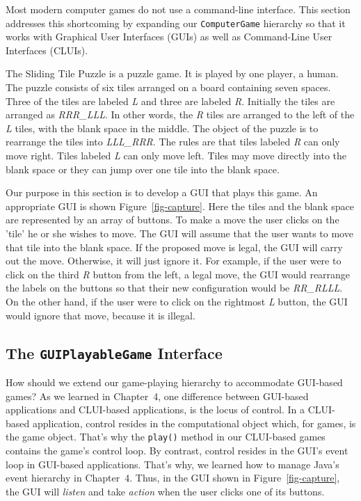 Most modern computer games do not use a command-line interface.  This
section addresses this shortcoming by expanding our {\tt ComputerGame}
hierarchy so that it works with Graphical User Interfaces (GUIs) as
well as Command-Line User Interfaces (CLUIs).

The Sliding Tile Puzzle is a puzzle game. It is played by one player,
a human. The puzzle consists of six tiles arranged on a board
containing seven spaces. Three of the tiles are labeled {\em L} and
three are labeled {\em R}.  Initially the tiles are arranged as {\em
RRR\_LLL}.  In other words, the {\em R} tiles are arranged to the left
of the {\em L} tiles, with the blank space in the middle. The object
of the puzzle is to rearrange the tiles into {\em LLL\_RRR}. The rules
are that tiles labeled {\em R} can only move right. Tiles labeled {\em
L} can only move left. Tiles may move directly into the blank space or
they can jump over one tile into the blank space.

Our purpose in this section is to develop a GUI that plays this
game. An appropriate GUI is shown Figure~\ref{fig-capture}.  Here the
tiles and the blank space are represented by an array of buttons.  To
make a move the user clicks on the 'tile' he or she wishes to
move. The GUI will assume that the user wants to move that tile into
the blank space. If the proposed move is legal, the GUI will carry out
the move. Otherwise, it will just ignore it. For example, if the user
were to click on the third {\em R} button from the left, a legal move,
the GUI would rearrange the labels on the buttons so that their new
configuration would be {\em RR\_RLLL}. On the other hand, if the user
were to click on the rightmost {\em L} button, the GUI would ignore
that move, because it is illegal.

\begin{figure}[h!]
\end{figure}

\subsection{The {\tt GUIPlayableGame} Interface}

How should we extend our game-playing hierarchy to accommodate
GUI-based games? As we learned in Chapter~4, one difference between
GUI-based applications and CLUI-based applications, is the locus of
control. In a CLUI-based application, control resides in the
computational object which, for games, is the game object.  That's why
the {\tt play()} method in our CLUI-based games contains the game's
control loop.  By contrast, control resides in the GUI's event loop in
GUI-based applications.  That's why, we learned how to
manage Java's event hierarchy in Chapter~4. Thus, in the GUI shown in
Figure~\ref{fig-capture}, the GUI will {\em listen} and take {\em
action} when the user clicks one of its buttons.

